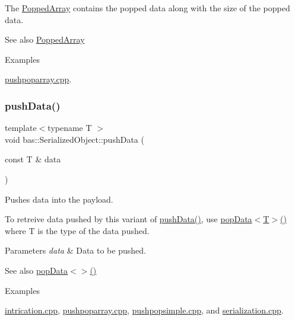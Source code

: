 The \mbox{\hyperlink{classbas_1_1PoppedArray}{Popped\+Array}} contains the popped data along with the size of the popped data. \begin{DoxySeeAlso}{See also}
\mbox{\hyperlink{classbas_1_1PoppedArray}{Popped\+Array}} 
\end{DoxySeeAlso}
\begin{Desc}
\item[Examples]\par
\mbox{\hyperlink{pushpoparray_8cpp-example}{pushpoparray.\+cpp}}.\end{Desc}
\mbox{\label{classbas_1_1SerializedObject_ae6d94b4b6c3d77dad3aab140ea6f7ca1}} 
\subsubsection{\texorpdfstring{pushData()}{pushData()}\hspace{0.1cm}{\footnotesize\ttfamily [1/2]}}
{\footnotesize\ttfamily template$<$typename T $>$ \\
void bas\+::\+Serialized\+Object\+::push\+Data (\begin{DoxyParamCaption}\item[{const T \&}]{data }\end{DoxyParamCaption})\hspace{0.3cm}{\ttfamily [inline]}}



Pushes data into the payload. 

To retreive data pushed by this variant of \mbox{\hyperlink{classbas_1_1SerializedObject_ae6d94b4b6c3d77dad3aab140ea6f7ca1}{push\+Data()}}, use \mbox{\hyperlink{classbas_1_1SerializedObject_aad2a332aaecd0fba8eac2bf06b60d5df}{pop\+Data$<$\+T$>$()}} where T is the type of the data pushed. 
\begin{DoxyParams}{Parameters}
{\em data} & Data to be pushed. \\
\hline
\end{DoxyParams}
\begin{DoxySeeAlso}{See also}
\mbox{\hyperlink{classbas_1_1SerializedObject_aad2a332aaecd0fba8eac2bf06b60d5df}{pop\+Data$<$$>$()}} 
\end{DoxySeeAlso}
\begin{Desc}
\item[Examples]\par
\mbox{\hyperlink{intrication_8cpp-example}{intrication.\+cpp}}, \mbox{\hyperlink{pushpoparray_8cpp-example}{pushpoparray.\+cpp}}, \mbox{\hyperlink{pushpopsimple_8cpp-example}{pushpopsimple.\+cpp}}, and \mbox{\hyperlink{serialization_8cpp-example}{serialization.\+cpp}}.\end{Desc}
\mbox{\label{classbas_1_1SerializedObject_acbf7e1dab49ddc312acf6bbde398a5be}} 
